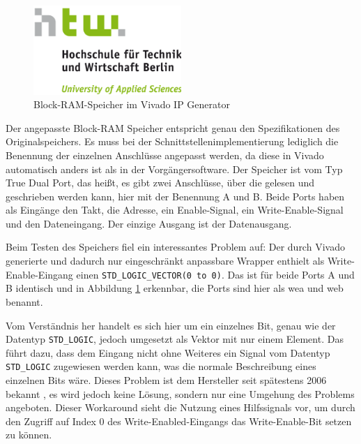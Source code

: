 \documentclass[11pt,a4paper,titlepage]{article}
\begin{document}
\begin{figure}[!ht]
\centering
\includegraphics[width=0.5\textwidth]{images/htw_hochschule.png}
\caption{Block-RAM-Speicher im Vivado IP Generator}
\label{img:BRAM_pins}
\end{figure}

Der angepasste Block-RAM Speicher entspricht genau den Spezifikationen des Originalspeichers. Es muss bei der Schnittstellenimplementierung lediglich die Benennung der einzelnen Anschlüsse angepasst werden, da diese in Vivado automatisch anders ist als in der Vorgängersoftware. Der Speicher ist vom Typ True Dual Port, das heißt, es gibt zwei Anschlüsse, über die gelesen und geschrieben werden kann, hier mit der Benennung A und B. Beide Ports haben als Eingänge den Takt, die Adresse, ein Enable-Signal, ein Write-Enable-Signal und den Dateneingang. Der einzige Ausgang ist der Datenausgang.


Beim Testen des Speichers fiel ein interessantes Problem auf: Der durch Vivado generierte und dadurch nur eingeschränkt anpassbare Wrapper enthielt als Write-Enable-Eingang einen \verb+STD_LOGIC_VECTOR(0 to 0)+. Das ist für beide Ports A und B identisch und in Abbildung \ref{img:BRAM_pins} erkennbar, die Ports sind hier als wea und web benannt.

Vom Verständnis her handelt es sich hier um ein einzelnes Bit, genau wie der Datentyp \verb+STD_LOGIC+, jedoch umgesetzt als Vektor mit nur einem Element. Das führt dazu, dass dem Eingang nicht ohne Weiteres ein Signal vom Datentyp \verb+STD_LOGIC+ zugewiesen werden kann, was die normale Beschreibung eines einzelnen Bits wäre. Dieses Problem ist dem Hersteller seit spätestens 2006 bekannt \cite{xilinx1}, es wird jedoch keine Lösung, sondern nur eine Umgehung des Problems angeboten. Dieser Workaround sieht die Nutzung eines Hilfssignals vor, um durch den Zugriff auf Index 0 des Write-Enabled-Eingangs das Write-Enable-Bit setzen zu können.
\end{document}
